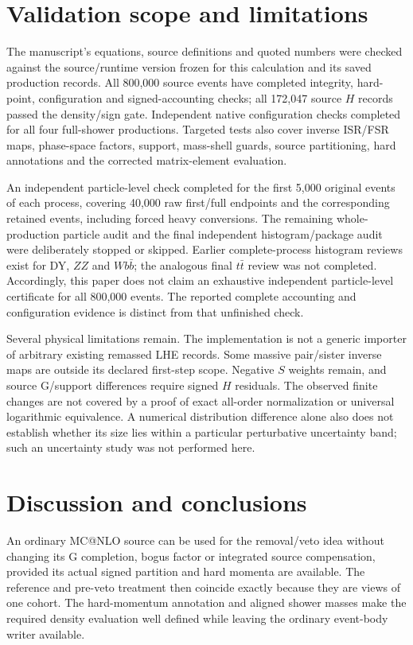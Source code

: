 \documentclass[11pt,a4paper]{article}
\makeatletter
\newcommand{\mcatnlo}{MC@NLO}
\makeatother
\begin{document}
\section{Validation scope and limitations}
\label{sec:validation}
The manuscript's equations, source definitions and quoted numbers were
checked against the source/runtime version frozen for this calculation
and its saved production records.
All 800,000 source events have completed integrity, hard-point,
configuration and signed-accounting checks; all 172,047 source $H$
records passed the density/sign gate. Independent native configuration
checks completed for all four full-shower productions. Targeted tests
also cover inverse ISR/FSR maps, phase-space factors, support, mass-shell
guards, source partitioning, hard annotations and the corrected
matrix-element evaluation.

An independent particle-level check completed for the first 5,000
original events of each process, covering 40,000 raw first/full
endpoints and the corresponding retained events, including forced
heavy conversions. The remaining whole-production particle audit and
the final independent histogram/package audit were deliberately
stopped or skipped. Earlier complete-process histogram reviews exist
for DY, $ZZ$ and $Wb\bar b$; the analogous final $t\bar t$ review was
not completed. Accordingly, this paper does not claim an exhaustive
independent particle-level certificate for all 800,000 events. The
reported complete accounting and configuration evidence is distinct
from that unfinished check.

Several physical limitations remain. The implementation is not a
generic importer of arbitrary existing remassed LHE records. Some
massive pair/sister inverse maps are outside its declared first-step
scope. Negative $S$ weights remain, and source G/support differences
require signed $H$ residuals. The observed finite changes are not
covered by a proof of exact all-order normalization or universal
logarithmic equivalence. A numerical distribution difference alone
also does not establish whether its size lies within a particular
perturbative uncertainty band; such an uncertainty study was not
performed here.

\section{Discussion and conclusions}
\label{sec:conclusion}
An ordinary \mcatnlo{} source can be used for the removal/veto idea
without changing its G completion, bogus factor or integrated source
compensation, provided its actual signed partition and hard momenta
are available. The reference and pre-veto treatment then coincide
exactly because they are views of one cohort. The hard-momentum
annotation and aligned shower masses make the required density
evaluation well defined while leaving the ordinary event-body writer
available.
\end{document}
